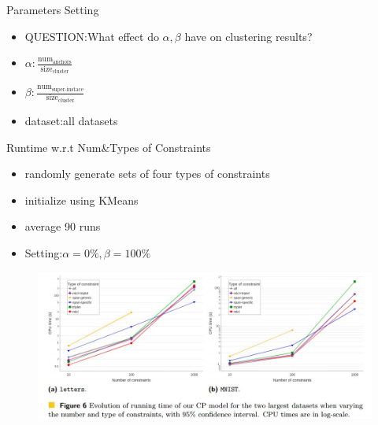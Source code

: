 \documentclass{beamer}
\begin{document}
\begin{frame}{Parameters Setting}
    \begin{itemize}
        \item QUESTION:What effect do  $\alpha,\beta$ have on clustering results?
        \item $\alpha:\frac{\text{num}_\text{anchors}}{\text{size}_\text{cluster}}$
        \item $\beta:\frac{\text{num}_\text{super-instace}}{\text{size}_\text{cluster}}$
        \item dataset:all datasets
    \end{itemize}
    \begin{figure}
        \centering
    \end{figure}

    
\end{frame}



\begin{frame}{Runtime w.r.t Num\&Types of Constraints}
    \begin{itemize}
        \item randomly generate sets of four types of constraints
        \item initialize using KMeans
        \item average 90 runs
        \item Setting:$\alpha=0\%,\beta=100\%$
    \end{itemize}
    \begin{figure}
        \centering
        \includegraphics[width=0.8\linewidth]{./images/runtime-single.jpg}
    \end{figure}
    
\end{frame}
\end{document}
